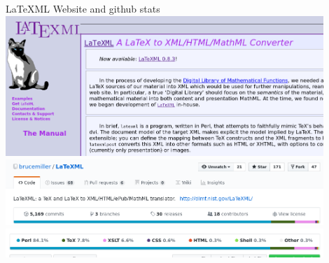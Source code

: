 \documentclass[9pt]{beamer}
\begin{document}
\begin{frame}{LaTeXML Website and github stats}
    \includegraphics[width=0.9\textwidth]{ltxml_website.png}
    \includegraphics[width=0.9\textwidth]{ltxml_github1.png}
    \includegraphics[width=0.9\textwidth]{ltxml_github2.png}
\end{frame}
\end{document}
